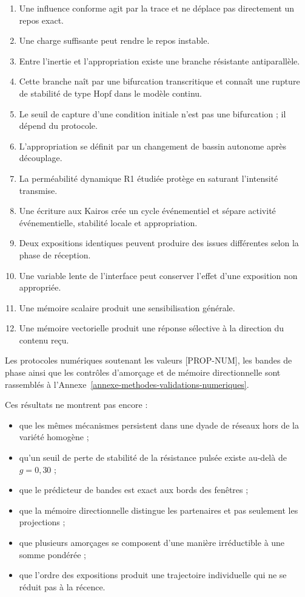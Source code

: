 \begin{enumerate}
\def\labelenumi{\arabic{enumi}.}
\tightlist
\item
  Une influence conforme agit par la trace et ne déplace pas directement un repos exact.
\item
  Une charge suffisante peut rendre le repos instable.
\item
  Entre l'inertie et l'appropriation existe une branche résistante antiparallèle.
\item
    Cette branche naît par une bifurcation transcritique et connaît une rupture de stabilité de type Hopf dans le modèle continu.
\item
  Le seuil de capture d'une condition initiale n'est pas une bifurcation ; il dépend du protocole.
\item
  L'appropriation se définit par un changement de bassin autonome après découplage.
\item
  La perméabilité dynamique R1 étudiée protège en saturant l'intensité transmise.
\item
  Une écriture aux Kairos crée un cycle événementiel et sépare activité événementielle, stabilité locale et appropriation.
\item
  Deux expositions identiques peuvent produire des issues différentes selon la phase de réception.
\item
  Une variable lente de l'interface peut conserver l'effet d'une exposition non appropriée.
\item
  Une mémoire scalaire produit une sensibilisation générale.
\item
  Une mémoire vectorielle produit une réponse sélective à la direction du contenu reçu.
\end{enumerate}

Les protocoles numériques soutenant les valeurs \textnormal{[PROP-NUM]}, les bandes de phase ainsi que les contrôles d'amorçage et de mémoire directionnelle sont rassemblés à l'Annexe~\ref{annexe-methodes-validations-numeriques}.

Ces résultats ne montrent pas encore :

\begin{itemize}
\tightlist
\item
  que les mêmes mécanismes persistent dans une dyade de réseaux hors de
  la variété homogène ;
\item
  qu'un seuil de perte de stabilité de la résistance pulsée existe
  au-delà de \(g=0{,}30\) ;
\item
  que le prédicteur de bandes est exact aux bords des fenêtres ;
\item
  que la mémoire directionnelle distingue les partenaires et pas
  seulement les projections ;
\item
  que plusieurs amorçages se composent d'une manière irréductible à une
  somme pondérée ;
\item
  que l'ordre des expositions produit une trajectoire individuelle qui
  ne se réduit pas à la récence.
\end{itemize}

